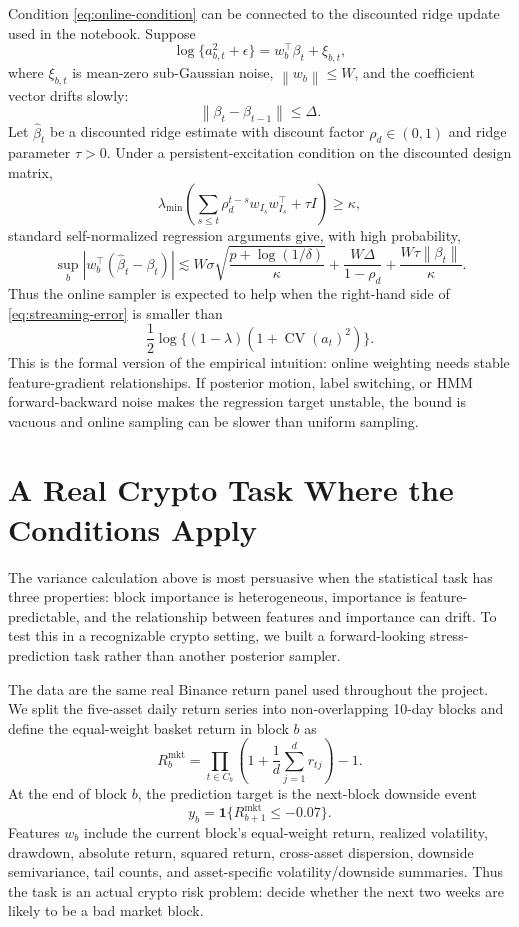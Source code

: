 \documentclass{article}
\newcommand{\1}{\mathbf{1}}
\newcommand{\norm}[1]{\left\lVert #1 \right\rVert}
\begin{document}
Condition \eqref{eq:online-condition} can be connected to the discounted ridge update used in the notebook. Suppose
\[
  \log\{a_{b,t}^2+\epsilon\}=w_b^\top \beta_t+\xi_{b,t},
\]
where $\xi_{b,t}$ is mean-zero sub-Gaussian noise, $\norm{w_b}\le W$, and the coefficient vector drifts slowly:
\[
  \norm{\beta_t-\beta_{t-1}}\le \Delta.
\]
Let $\widehat \beta_t$ be a discounted ridge estimate with discount factor $\rho_d\in(0,1)$ and ridge parameter $\tau>0$. Under a persistent-excitation condition on the discounted design matrix,
\[
  \lambda_{\min}\!\left(\sum_{s\le t}\rho_d^{t-s} w_{I_s}w_{I_s}^\top+\tau I\right) \ge \kappa,
\]
standard self-normalized regression arguments give, with high probability,
\[
  \sup_b |w_b^\top(\widehat\beta_t-\beta_t)|
  \lesssim
  W\sigma\sqrt{\frac{p+\log(1/\delta)}{\kappa}}
  + \frac{W\Delta}{1-\rho_d}
  + \frac{W\tau\norm{\beta_t}}{\kappa}.
  \label{eq:streaming-error}
\]
Thus the online sampler is expected to help when the right-hand side of \eqref{eq:streaming-error} is smaller than
\[
  \frac{1}{2}\log\{(1-\lambda)(1+\operatorname{CV}(a_t)^2)\}.
\]
This is the formal version of the empirical intuition: online weighting needs stable feature-gradient relationships. If posterior motion, label switching, or HMM forward-backward noise makes the regression target unstable, the bound is vacuous and online sampling can be slower than uniform sampling.

\section{A Real Crypto Task Where the Conditions Apply}
\label{sec:actual-crypto-task}

The variance calculation above is most persuasive when the statistical task has three properties: block importance is heterogeneous, importance is feature-predictable, and the relationship between features and importance can drift. To test this in a recognizable crypto setting, we built a forward-looking stress-prediction task rather than another posterior sampler.

The data are the same real Binance return panel used throughout the project. We split the five-asset daily return series into non-overlapping 10-day blocks and define the equal-weight basket return in block $b$ as
\[
  R_b^{\mathrm{mkt}}
  =
  \prod_{t\in C_b}
  \left(1+\frac{1}{d}\sum_{j=1}^d r_{tj}\right)-1.
\]
At the end of block $b$, the prediction target is the next-block downside event
\begin{equation}
  y_b
  =
  \1\{R_{b+1}^{\mathrm{mkt}}\le -0.07\}.
  \label{eq:crypto-risk-label}
\end{equation}
Features $w_b$ include the current block's equal-weight return, realized volatility, drawdown, absolute return, squared return, cross-asset dispersion, downside semivariance, tail counts, and asset-specific volatility/downside summaries. Thus the task is an actual crypto risk problem: decide whether the next two weeks are likely to be a bad market block.
\end{document}
